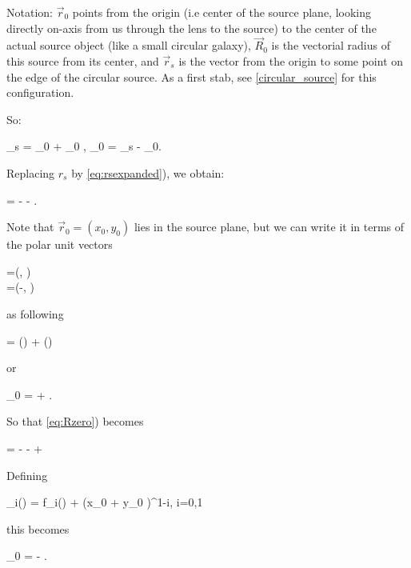 Notation: $ \vec{r}_{0}$ points from the origin (i.e center of the
source plane, looking directly on-axis from us through the lens to the
source) to the center of the actual source object (like a small
circular galaxy), $ \vec{R}_{0}$ is the vectorial radius of this
source from its center, and $ \vec{r}_{s}$ is the vector from the
origin to some point on the edge of the circular source. As a first
stab, see \ref{circular_source} for this configuration.

So:

\beq
{}_s =  _{0} + _{0} , \quad \rightarrow {}_{0} = _s - _{0}.
\eeq


Replacing $r_s$ by \eqref{eq:rsexpanded}), we obtain:

\beq
\label{eq:Rzero}
 =  -   \hat{\theta} - . \;\;\;
\eeq


Note that $\vec{r}_{0} = (x_0,y_0)$ lies in the source plane, but we
can write it in terms of the polar unit vectors

\bea
\label{eq:unitvs}
=(\cos\te, \sin \te) \\
\hat{\theta}=(-\sin \te, \cos \te)
\eea

 as following

\beq
\vecrz = (\vecrz \cdot \hatth) \hatth + (\vecrz \cdot \hatr) \hatr
\eeq

or

\beq
\label{eq:rzero}
_{0} =   +  \hat{\theta}.  \;\;\;
\eeq

So that \eqref{eq:Rzero}) becomes

\beq
{} =  -   \hat{\theta} -    +  \hat{\theta} \;\;\;
\eeq


Defining

\beq
{}_i(\theta) = f_i(\theta) + (x_0 \cos \te + y_0 \sin \te)\re^{1-i}, \;\; i=0,1
\eeq

this becomes

\beq
{}_{0} =  -   \hat{\theta}. \;\;\; \label{Eq_Alard11}
\eeq


